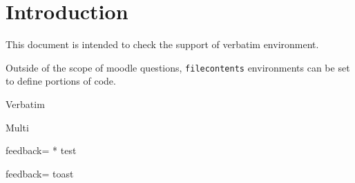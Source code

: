 \documentclass{article}
\begin{document}
\section*{Introduction}

This document is intended to check the support of verbatim environment.

Outside of the scope of moodle questions, \texttt{filecontents} environments 
can be set to define portions of code.

\begin{quiz}{Verbatim}


\begin{multi}{Multi}

\item[feedback={}]* test
\item[feedback={}] toast
\end{multi}

\end{quiz}
\end{document}
